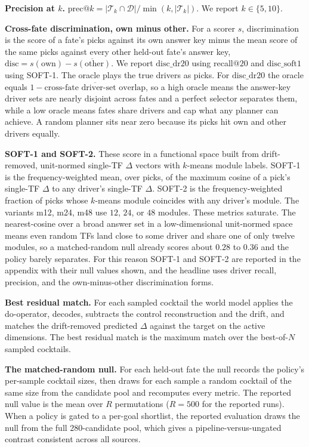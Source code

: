 \textbf{Precision at $k$.} $\mathrm{prec}@k = \lvert\mathcal{T}_k\cap\mathcal{D}\rvert/\min(k,\lvert\mathcal{T}_k\rvert)$.
We report $k\in\{5,10\}$.

\textbf{Cross-fate discrimination, own minus other.} For a scorer $s$, discrimination is the
score of a fate's picks against its own answer key minus the mean score of the same picks
against every other held-out fate's answer key, $\mathrm{disc}=s(\text{own})-\overline{s(\text{other})}$.
We report $\mathrm{disc\_dr20}$ using recall@$20$ and
$\mathrm{disc\_soft1}$ using SOFT-1. The oracle plays the true drivers as picks. For
$\mathrm{disc\_dr20}$ the oracle equals $1-\overline{\text{cross-fate driver-set overlap}}$,
so a high oracle means the answer-key driver sets are nearly disjoint across
fates and a perfect selector separates them, while a low oracle means fates share drivers
and cap what any planner can achieve. A random planner sits near zero because its picks hit
own and other drivers equally.

\textbf{SOFT-1 and SOFT-2.} These score in a functional space built from drift-removed,
unit-normed single-TF $\Delta$ vectors with $k$-means module labels. SOFT-1 is the
frequency-weighted mean, over picks, of
the maximum cosine of a pick's single-TF $\Delta$ to any driver's single-TF $\Delta$. SOFT-2
is the frequency-weighted fraction of picks whose $k$-means module coincides with any driver's
module. The variants m12, m24, m48 use $12$, $24$, or $48$ modules. These metrics saturate.
The nearest-cosine over a broad answer set in a low-dimensional unit-normed space means even
random TFs land close to some driver and share one of only twelve modules, so a matched-random
null already scores about $0.28$ to $0.36$ and the policy barely separates. For this reason
SOFT-1 and SOFT-2 are reported in the appendix with their null values shown, and the
headline uses driver recall, precision, and the own-minus-other discrimination forms.

\textbf{Best residual match.} For each sampled cocktail the world model applies the
do-operator, decodes, subtracts the control reconstruction and the drift, and matches the
drift-removed predicted $\Delta$ against the target on the active dimensions. The best
residual match is the maximum match over the best-of-$N$ sampled cocktails.

\textbf{The matched-random null.} For each held-out fate the null records the policy's
per-sample cocktail sizes, then draws for each sample a random cocktail of the same size
from the candidate pool and recomputes every metric. The reported null value is the mean
over $R$ permutations ($R{=}500$ for the reported runs). When a policy is gated to a
per-goal shortlist, the reported evaluation draws the null from the full $280$-candidate
pool, which gives a pipeline-versus-ungated contrast consistent across all sources.

